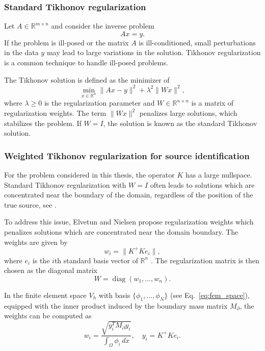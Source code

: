 \subsubsection{Standard Tikhonov regularization}

Let $A \in \mathbb{R}^{m \times n}$ and consider the inverse problem
\begin{equation}
    Ax = y.
\end{equation}
If the problem is ill-posed or the matrix $A$ is ill-conditioned, small perturbations in the data $y$ may lead to large variations in the solution. Tikhonov regularization is a common technique to handle ill-posed problems.

The Tikhonov solution is defined as the minimizer of
\begin{equation}\label{eq:tikhonov}
    \min_{x \in \mathbb{R}^n}
    \|Ax - y\|^2 + \lambda^2 \|Wx\|^2,
\end{equation}
where $\lambda \ge 0$ is the regularization parameter and $W \in \mathbb{R}^{n \times n}$ is a matrix of regularization weights. The term $\|Wx\|^2$ penalizes large solutions, which stabilizes the problem. If $W = I$, the solution is known as the standard Tikhonov solution.


\subsubsection{Weighted Tikhonov regularization for source identification}
For the problem considered in this thesis, the operator $K$ has a large nullspace. Standard Tikhonov regularization with $W = I$ often leads to solutions which are concentrated  near the boundary of the domain, regardless of the position of the true source, see \cite{elvetunRegularizationOperatorSource2020}.

To address this issue, Elvetun and Nielsen propose regularization weights which penalizes solutions which are concentrated near the domain boundary. The weights are given by
\begin{equation}
    w_i = \|K^+ K e_i\|,
\end{equation}
where $e_i$ is the $i$th standard basis vector of $\mathbb{R}^n$ \cite{elvetunRegularizationOperatorSource2020}. The regularization matrix is then chosen as the diagonal matrix
\begin{equation}
    W = \operatorname{diag}(w_1, \dots, w_n).
\end{equation}

In the finite element space $V_h$ with basis $\{\phi_1, \dots, \phi_N\}$ (see Eq.~\eqref{eq:fem_space}), equipped with the inner product
induced by the boundary mass matrix $M_\partial$, the weights can be computed as
\begin{equation}\label{eq:weights_fem}
    w_i =
    \frac{\sqrt{y_i^T M_\partial y_i}}{\int_\Omega \phi_i \, dx},
    \quad
    y_i = K^+ K e_i.
\end{equation}


